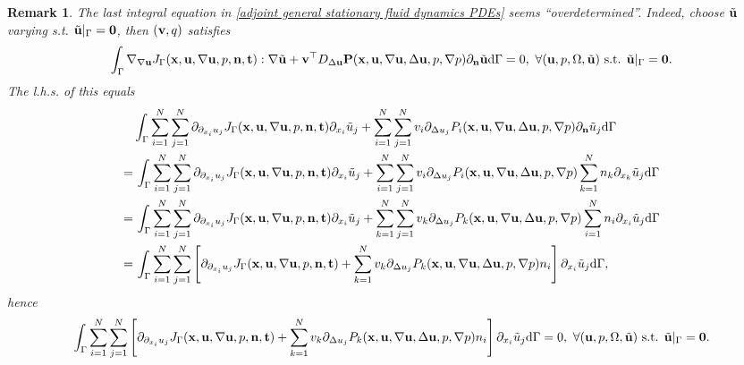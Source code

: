 \documentclass[oneside,11pt]{book}
\numberwithin{equation}{section}
\newtheorem{remark}{Remark}[section]
\begin{document}
\begin{itemize}[leftmargin=0in]
    \begin{remark}
        The last integral equation in \eqref{adjoint general stationary fluid dynamics PDEs} seems ``overdetermined''. Indeed, choose $\tilde{\bf u}$ varying s.t. $\tilde{\bf u}|_\Gamma = {\bf 0}$, then $({\bf v},q)$ satisfies
        \begin{align*}
            \int_\Gamma \nabla_{\nabla{\bf u}}J_\Gamma({\bf x},{\bf u},\nabla{\bf u},p,{\bf n},{\bf t}):\nabla\tilde{\bf u} + {\bf v}^\top D_{\Delta{\bf u}}{\bf P}({\bf x},{\bf u},\nabla{\bf u},\Delta{\bf u},p,\nabla p)\partial_{\bf n}\tilde{\bf u}{\rm d}\Gamma = 0,\ \forall({\bf u},p,\Omega,\tilde{\bf u}) \mbox{ s.t. } \tilde{\bf u}|_\Gamma = {\bf 0}.
        \end{align*}
        The l.h.s. of this equals
        \begin{align*}
            &\int_\Gamma \sum_{i=1}^N\sum_{j=1}^N \partial_{\partial_{x_i}u_j}J_\Gamma({\bf x},{\bf u},\nabla{\bf u},p,{\bf n},{\bf t})\partial_{x_i}\tilde{u}_j + \sum_{i=1}^N\sum_{j=1}^N v_i\partial_{\Delta u_j}P_i({\bf x},{\bf u},\nabla{\bf u},\Delta{\bf u},p,\nabla p)\partial_{\bf n}\tilde{u}_j{\rm d}\Gamma\\
            =&\, \int_\Gamma \sum_{i=1}^N\sum_{j=1}^N \partial_{\partial_{x_i}u_j}J_\Gamma({\bf x},{\bf u},\nabla{\bf u},p,{\bf n},{\bf t})\partial_{x_i}\tilde{u}_j + \sum_{i=1}^N\sum_{j=1}^N v_i\partial_{\Delta u_j}P_i({\bf x},{\bf u},\nabla{\bf u},\Delta{\bf u},p,\nabla p)\sum_{k=1}^N n_k\partial_{x_k}\tilde{u}_j{\rm d}\Gamma\\
            =&\, \int_\Gamma \sum_{i=1}^N\sum_{j=1}^N \partial_{\partial_{x_i}u_j}J_\Gamma({\bf x},{\bf u},\nabla{\bf u},p,{\bf n},{\bf t})\partial_{x_i}\tilde{u}_j + \sum_{k=1}^N\sum_{j=1}^N v_k\partial_{\Delta u_j}P_k({\bf x},{\bf u},\nabla{\bf u},\Delta{\bf u},p,\nabla p)\sum_{i=1}^N n_i\partial_{x_i}\tilde{u}_j{\rm d}\Gamma\\
            =&\, \int_\Gamma \sum_{i=1}^N\sum_{j=1}^N \left[\partial_{\partial_{x_i}u_j}J_\Gamma({\bf x},{\bf u},\nabla{\bf u},p,{\bf n},{\bf t}) + \sum_{k=1}^N v_k\partial_{\Delta u_j}P_k({\bf x},{\bf u},\nabla{\bf u},\Delta{\bf u},p,\nabla p)n_i\right]\partial_{x_i}\tilde{u}_j{\rm d}\Gamma,
        \end{align*}
        hence
        \begin{align*}
            \int_\Gamma \sum_{i=1}^N\sum_{j=1}^N \left[\partial_{\partial_{x_i}u_j}J_\Gamma({\bf x},{\bf u},\nabla{\bf u},p,{\bf n},{\bf t}) + \sum_{k=1}^N v_k\partial_{\Delta u_j}P_k({\bf x},{\bf u},\nabla{\bf u},\Delta{\bf u},p,\nabla p)n_i\right]\partial_{x_i}\tilde{u}_j{\rm d}\Gamma = 0,\ \forall({\bf u},p,\Omega,\tilde{\bf u}) \mbox{ s.t. } \tilde{\bf u}|_\Gamma = {\bf 0}.

\end{align*}
\end{remark}
\end{itemize}
\end{document}
